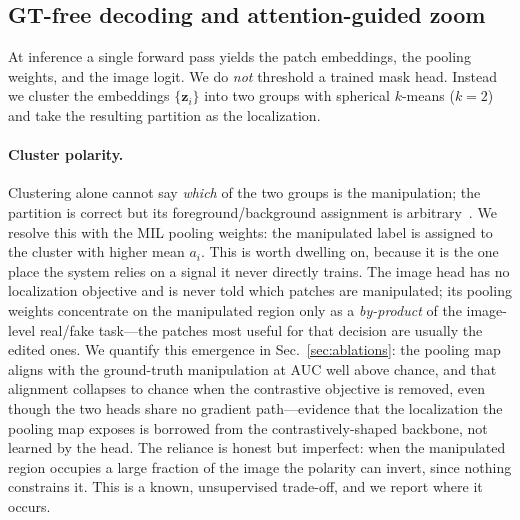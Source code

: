 \subsection{GT-free decoding and attention-guided zoom}
\label{sec:decode}
At inference a single forward pass yields the patch embeddings, the pooling
weights, and the image logit. We do \emph{not} threshold a trained mask head.
Instead we cluster the embeddings $\{\mathbf{z}_i\}$ into two groups with
spherical $k$-means ($k{=}2$) and take the resulting partition as the localization.

\paragraph{Cluster polarity.}
Clustering alone cannot say \emph{which} of the two groups is the manipulation;
the partition is correct but its foreground/background assignment is
arbitrary~\cite{huh2018fighting}. We resolve this with the MIL pooling weights:
the manipulated label is assigned to the cluster with higher mean $a_i$. This is
worth dwelling on, because it is the one place the system relies on a signal it
never directly trains. The image head has no localization objective and is never
told which patches are manipulated; its pooling weights concentrate on the
manipulated region only as a \emph{by-product} of the image-level real/fake
task---the patches most useful for that decision are usually the edited ones. We
quantify this emergence in Sec.~\ref{sec:ablations}: the pooling map aligns with
the ground-truth manipulation at AUC well above chance, and that alignment
collapses to chance when the contrastive objective is removed, even though the
two heads share no gradient path---evidence that the localization the pooling
map exposes is borrowed from the contrastively-shaped backbone, not learned by
the head. The reliance is honest but imperfect: when the manipulated region
occupies a large fraction of the image the polarity can invert, since nothing
constrains it. This is a known, unsupervised trade-off, and we report where it
occurs.

